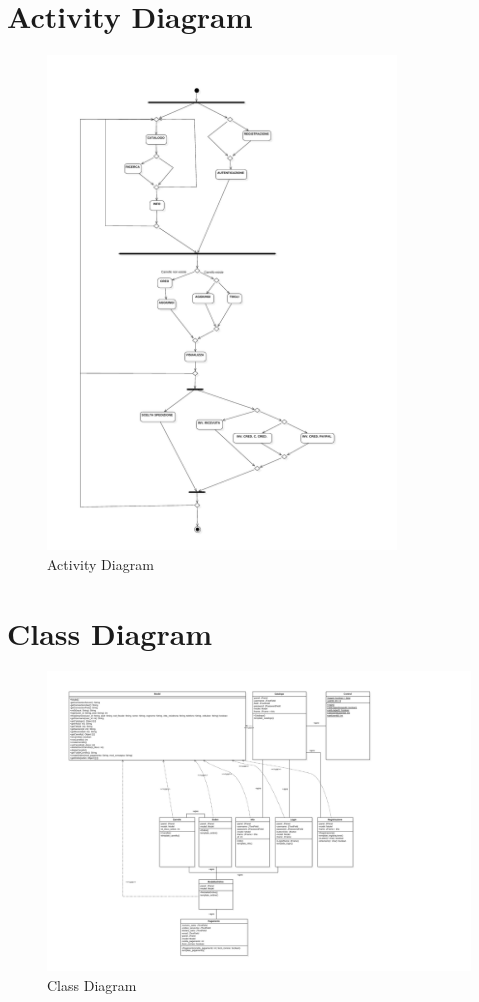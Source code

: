 \documentclass[a4paper,titlepage]{book}
\begin{document}
\section{Activity Diagram}
\begin{figure}[H]
\center
\includegraphics[width=350px]{img/Activity.pdf}
\caption{Activity Diagram \label{fig:act}}
\end{figure}

\section{Class Diagram}
\begin{figure}[H]
\center
\includegraphics[width=450px]{img/Class.pdf}
\caption{Class Diagram \label{fig:cla}}
\end{figure}
\end{document}
